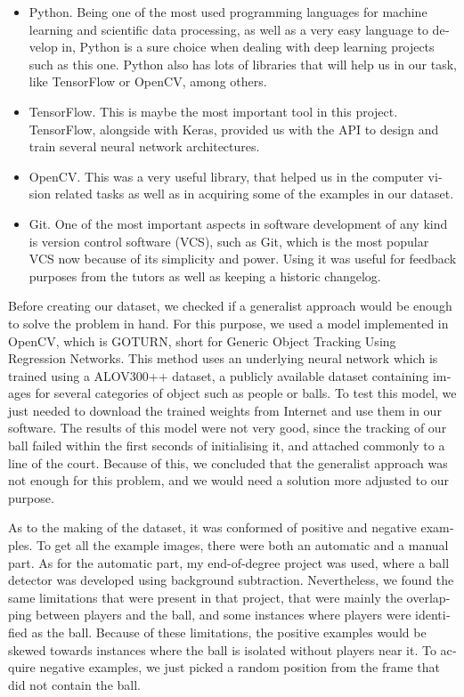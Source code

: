 \begin{otherlanguage}{english}
\begin{itemize}
    \item Python. Being one of the most used programming languages for machine learning and scientific data processing, as well as a very easy language to develop in, Python is a sure choice when dealing with deep learning projects such as this one. Python also has lots of libraries that will help us in our task, like TensorFlow or OpenCV, among others.
    \item TensorFlow. This is maybe the most important tool in this project. TensorFlow, alongside with Keras, provided us with the API to design and train several neural network architectures.
    \item OpenCV. This was a very useful library, that helped us in the computer vision related tasks as well as in acquiring some of the examples in our dataset.
    \item Git. One of the most important aspects in software development of any kind is version control software (VCS), such as Git, which is the most popular VCS now because of its simplicity and power. Using it was useful for feedback purposes from the tutors as well as keeping a historic changelog.
\end{itemize}

Before creating our dataset, we checked if a generalist approach would be enough to solve the problem in hand. For this purpose, we used a model implemented in OpenCV, which is GOTURN, short for Generic Object Tracking Using Regression Networks. This method uses an underlying neural network which is trained using a ALOV300++ dataset, a publicly available dataset containing images for several categories of object such as people or balls. To test this model, we just needed to download the trained weights from Internet and use them in our software. The results of this model were not very good, since the tracking of our ball failed within the first seconds of initialising it, and attached commonly to a line of the court. Because of this, we concluded that the generalist approach was not enough for this problem, and we would need a solution more adjusted to our purpose.

As to the making of the dataset, it was conformed of positive and negative examples. To get all the example images, there were both an automatic and a manual part. As for the automatic part, my end-of-degree project was used, where a ball detector was developed using background subtraction. Nevertheless, we found the same limitations that were present in that project, that were mainly the overlapping between players and the ball, and some instances where players were identified as the ball. Because of these limitations, the positive examples would be skewed towards instances where the ball is isolated without players near it. To acquire negative examples, we just picked a random position from the frame that did not contain the ball.


\end{otherlanguage}
